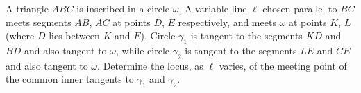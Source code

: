 A triangle $ABC$ is inscribed in a circle $\omega$. A variable line $\ell$ chosen parallel to $BC$ meets segments $AB$, $AC$ at points $D$, $E$ respectively, and meets $\omega$ at points $K$, $L$ (where $D$ lies between $K$ and $E$). Circle $\gamma_1$ is tangent to the segments $KD$ and $BD$ and also tangent to $\omega$, while circle $\gamma_2$ is tangent to the segments $LE$ and $CE$ and also tangent to $\omega$. Determine the locus, as $\ell$ varies, of the meeting point of the common inner tangents to $\gamma_1$ and $\gamma_2$.